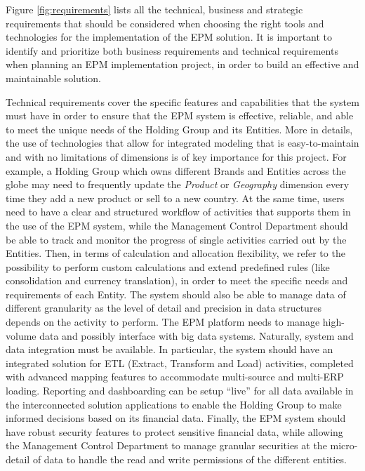 \documentclass[12pt,a4paper,openright,twoside]{book}
\begin{document}
Figure \ref{fig:requirements} lists all the technical, business and strategic requirements that should be considered when choosing the right tools and technologies for the implementation of the EPM solution.
%
It is important to identify and prioritize both business requirements and technical requirements when planning an EPM implementation project, in order to build an effective and maintainable solution.

Technical requirements cover the specific features and capabilities that the system must have in order to ensure that the EPM system is effective, reliable, and able to meet the unique needs of the Holding Group and its Entities.
%
More in details, the use of technologies that allow for integrated modeling that is easy-to-maintain and with no limitations of dimensions is of key importance for this project.
%
For example, a Holding Group which owns different Brands and Entities across the globe may need to frequently update the \textit{Product} or \textit{Geography} dimension every time they add a new product or sell to a new country.
%
At the same time, users need to have a clear and structured workflow of activities that supports them in the use of the EPM system, while the Management Control Department should be able to track and monitor the progress of single activities carried out by the Entities.
%
Then, in terms of calculation and allocation flexibility, we refer to the possibility to perform custom calculations and extend predefined rules (like consolidation and currency translation), in order to meet the specific needs and requirements of each Entity.
%
The system should also be able to manage data of different granularity as the level of detail and precision in data structures depends on the activity to perform.
%
The EPM platform needs to manage high-volume data and possibly interface with big data systems.
%
Naturally, system and data integration must be available.
%
In particular, the system should have an integrated solution for ETL (Extract, Transform and Load) activities, completed with advanced mapping features to accommodate multi-source and multi-ERP loading.
%
Reporting and dashboarding can be setup ``live'' for all data available in the interconnected solution
applications to enable the Holding Group to make informed decisions based on its financial data.
%
Finally, the EPM system should have robust security features to protect sensitive financial data, while allowing the Management Control Department to manage granular securities at the micro-detail of data to handle the read and write permissions of the different entities.
\end{document}
